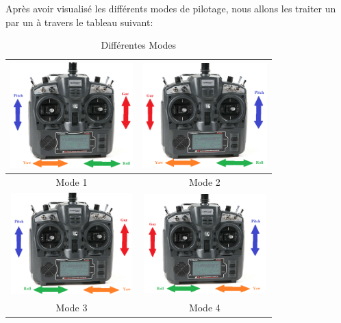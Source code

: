 	Après avoir visualisé les différents modes de pilotage, nous allons les traiter un par un à travers le tableau suivant:
	\begin{table}[H]
		\begin{center}
			
			\caption{Différentes Modes }
			\begin{tabular}{|c|c|}
				\hline
				
				\centering
				
				\includegraphics[width=4.74cm]{Images/Mode 1(Radiocommande)} & \includegraphics[width=4.8cm]{Images/Mode 2(Radiocommande)}\\
				\hline
				\centering
				
				Mode 1 & Mode 2 \\
				
				\hline
				\centering
				\includegraphics[width=4.69999cm]{Images/Mode 3(Radiocommande)}& \includegraphics[width=4.69999cm]{Images/Mode 4(Radiocommande)}\\
				\hline
				\centering
				
				Mode 3 &  Mode 4 \\
				\hline
			\end{tabular}
		\end{center}
	\end{table}

